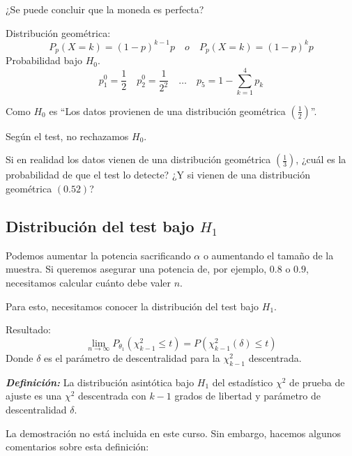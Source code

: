 ¿Se puede concluir que la moneda es perfecta?

Distribución geométrica:
\[
    P_p(X=k)=(1-p)^{k-1}p \quad o \quad P_p(X=k)=(1-p)^{k}p
\]
Probabilidad bajo $H_0$.
\[
    p_1^0=\frac{1}{2} \quad p_2^0=\frac{1}{2^2} \quad \dots \quad p_5=1-\sum_{k=1}^{4} p_k
\]

Como $H_0$ es ``Los datos provienen de una distribución geométrica $\left(\frac{1}{2}\right)$''.

Según el test, no rechazamos $H_0$.

Si en realidad los datos vienen de una distribución geométrica $\left(\frac{1}{3}\right)$,  
¿cuál es la probabilidad de que el test lo detecte?  
¿Y si vienen de una distribución geométrica $(0.52)$?

\subsection{Distribución del test bajo $H_1$}

Podemos aumentar la potencia sacrificando $\alpha$ o aumentando el tamaño de la muestra.  
Si queremos asegurar una potencia de, por ejemplo, $0.8$ o $0.9$, necesitamos calcular cuánto debe valer $n$.

Para esto, necesitamos conocer la distribución del test bajo $H_1$.

Resultado:
\[
\lim_{n \to \infty} P_{\theta_1} (\chi^2_{k-1} \leq t) = P(\chi^2_{k-1}(\delta) \leq t)
\]
Donde $\delta$ es el parámetro de descentralidad para la $\chi^2_{k-1}$ descentrada.

\textit{\textbf{Definición:}} La distribución asintótica bajo $H_1$ del estadístico $\chi^2$ de prueba de ajuste es una $\chi^2$ descentrada con $k-1$ grados de libertad y parámetro de descentralidad $\delta$.

La demostración no está incluida en este curso. Sin embargo, hacemos algunos comentarios sobre esta definición:

